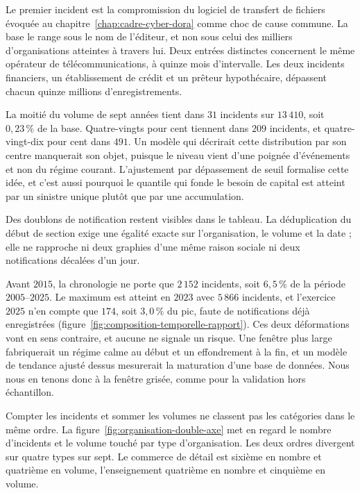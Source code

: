 \vspace{2pt}
\noindent Le premier incident est la compromission du logiciel de transfert de fichiers évoquée au
chapitre~\ref{chap:cadre-cyber-dora} comme choc de cause commune. La base le range sous le nom de
l'éditeur, et non sous celui des milliers d'organisations atteintes à travers lui. Deux entrées
distinctes concernent le même opérateur de télécommunications, à quinze mois d'intervalle. Les deux
incidents financiers, un établissement de crédit et un prêteur hypothécaire, dépassent chacun quinze
millions d'enregistrements.

La moitié du volume de sept années tient dans $31$ incidents sur $13\,410$, soit $0{,}23\,\%$ de la
base. Quatre-vingts pour cent tiennent dans $209$ incidents, et quatre-vingt-dix pour cent dans $491$.
Un modèle qui décrirait cette distribution par son centre manquerait son objet, puisque le niveau vient
d'une poignée d'événements et non du régime courant. L'ajustement par dépassement de seuil formalise
cette idée, et c'est aussi pourquoi le quantile qui fonde le besoin de capital est atteint par un
sinistre unique plutôt que par une accumulation.

Des doublons de notification restent visibles dans le tableau. La déduplication du début de section
exige une égalité exacte sur l'organisation, le volume et la date ; elle ne rapproche ni deux graphies
d'une même raison sociale ni deux notifications décalées d'un jour.

Avant $2015$, la
chronologie ne porte que $2\,152$ incidents, soit $6{,}5\,\%$ de la période $2005$--$2025$. Le maximum
est atteint en $2023$ avec $5\,866$ incidents, et l'exercice $2025$ n'en compte que $174$, soit
$3{,}0\,\%$ du pic, faute de notifications déjà enregistrées (figure~\ref{fig:composition-temporelle-rapport}).
Ces deux déformations vont en sens contraire, et aucune ne signale un risque. Une fenêtre plus large
fabriquerait un régime calme au début et un effondrement à la fin, et un modèle de tendance ajusté
dessus mesurerait la maturation d'une base de données. Nous nous en tenons donc à la fenêtre grisée,
comme pour la validation hors échantillon.

Compter les incidents et sommer les volumes ne classent pas les catégories dans le même ordre. La
figure~\ref{fig:organisation-double-axe} met en regard le nombre d'incidents et le volume touché par type
d'organisation. Les deux ordres divergent sur quatre types sur sept. Le commerce de détail est sixième en
nombre et quatrième en volume, l'enseignement quatrième en nombre et cinquième en volume.

